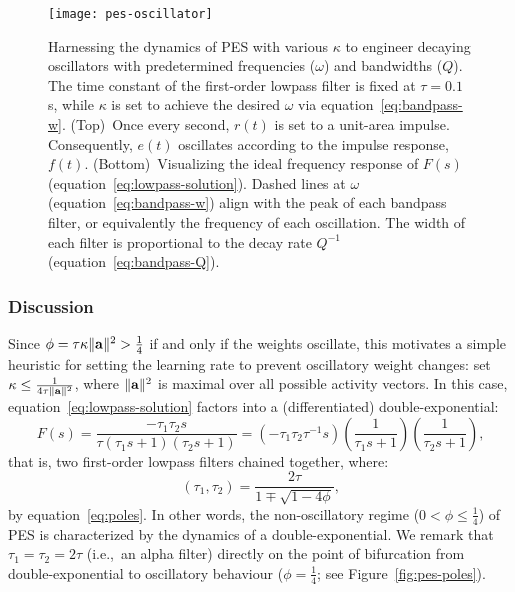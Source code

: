 \begin{figure}
\centering
\texttt{[image: pes-oscillator]}
\caption{ \label{fig:pes-oscillator}
  Harnessing the dynamics of PES with various $\kappa$ to engineer decaying oscillators with predetermined frequencies ($\omega$) and bandwidths ($Q$).
  The time constant of the first-order lowpass filter is fixed at $\tau = 0.1\,$s, while $\kappa$ is set to achieve the desired $\omega$ via equation~\ref{eq:bandpass-w}.
  (Top)~Once every second, $r(t)$ is set to a unit-area impulse.
  Consequently, $e(t)$ oscillates according to the impulse response, $f(t)$.
  (Bottom)~Visualizing the ideal frequency response of $F(s)$ (equation~\ref{eq:lowpass-solution}).
  Dashed lines at $\omega$ (equation~\ref{eq:bandpass-w}) align with the peak of each bandpass filter, or equivalently the frequency of each oscillation.
  The width of each filter is proportional to the decay rate $Q^{-1}$ (equation~\ref{eq:bandpass-Q}).
}
\end{figure}

\subsubsection{Discussion}

Since $\phi = \tau \kappa \|\mathbf{a}\|^2 > \frac{1}{4}$ if and only if the weights oscillate, this motivates a simple heuristic for setting the learning rate to prevent oscillatory weight changes: set $\kappa \le \frac{1}{4 \tau \|\mathbf{a}\|^2}$, where $\|\mathbf{a}\|^2$ is maximal over all possible activity vectors.
In this case, equation~\ref{eq:lowpass-solution} factors into a (differentiated) double-exponential:
\begin{equation*}
F(s) = \frac{-\tau_1 \tau_2 s}{\tau (\tau_1 s + 1)(\tau_2 s + 1)} = \left( - \tau_1 \tau_2 \tau^{-1} s \right) \left( \frac{1}{\tau_1 s + 1}\right) \left(\frac{1}{\tau_2 s + 1}\right) \text{,}
\end{equation*}
that is, two first-order lowpass filters chained together, where:
\begin{equation*}
\left( \tau_1, \tau_2 \right) = \frac{2 \tau}{1 \mp \sqrt{1 - 4 \phi}} \text{,}
\end{equation*}
by equation~\ref{eq:poles}.
In other words, the non-oscillatory regime ($0 < \phi \le \frac{1}{4}$) of PES is characterized by the dynamics of a double-exponential.
We remark that $\tau_1 = \tau_2 = 2 \tau$ (i.e.,~an alpha filter) directly on the point of bifurcation from double-exponential to oscillatory behaviour ($\phi = \frac{1}{4}$; see Figure~\ref{fig:pes-poles}).

